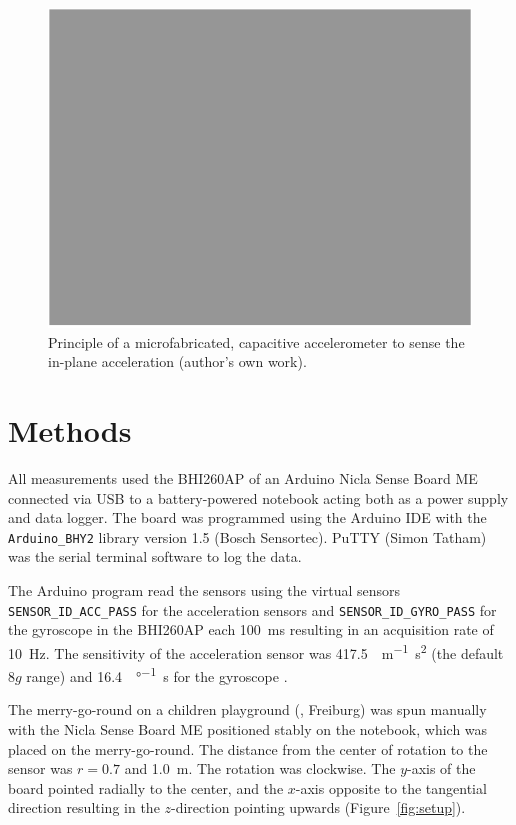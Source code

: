 \documentclass[DIV=14]{scrarticle}
\begin{document}
\begin{figure}[h]
    \centering
    \includegraphics[width=.6\textwidth]{figures/empty.drawio.pdf}
    \caption{Principle of a microfabricated, capacitive accelerometer to sense the in-plane acceleration (author's own work).}
    \label{fig:gyroscope}
\end{figure}

\clearpage


\section{Methods}
All measurements used the BHI260AP of an Arduino Nicla Sense Board ME connected via USB to a battery-powered notebook acting both as a power supply and data logger. The board was programmed using the Arduino IDE with the \texttt{Arduino\_BHY2} library version 1.5 (Bosch Sensortec). PuTTY (Simon Tatham) was the serial terminal software to log the data.

The Arduino program read the sensors using the virtual sensors \texttt{SENSOR\_ID\_ACC\_PASS} for the acceleration sensors and \texttt{SENSOR\_ID\_GYRO\_PASS} for the gyroscope in the BHI260AP each \SI{100}{\milli\second} resulting in an acquisition rate of \SI{10}{\hertz}. The sensitivity of the acceleration sensor was \SI{417.5}{\LSB\per\metre\square\second} (the default 8$g$ range) and \SI{16.4}{\LSB\per\degree\second} for the gyroscope \cite{BHI260}.

The merry-go-round on a children playground (, Freiburg) was spun manually with the Nicla Sense Board ME positioned stably on the notebook, which was placed on the merry-go-round. The distance from the center of rotation to the sensor was $r=0.7$ and \SI{1.0}{\metre}. The rotation was clockwise. The $y$-axis of the board pointed radially to the center, and the $x$-axis opposite to the tangential direction resulting in the $z$-direction pointing upwards (Figure~\ref{fig:setup}).
\end{document}
